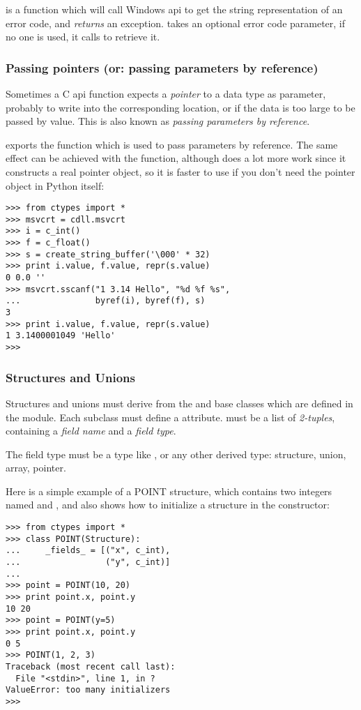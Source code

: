  is a function which will call Windows 
api to get the string representation of an error code, and \emph{returns}
an exception.   takes an optional error code parameter, if
no one is used, it calls  to retrieve it.


\subsubsection{Passing pointers (or: passing parameters by reference)\label{ctypes-passing-pointers}}

Sometimes a C api function expects a \emph{pointer} to a data type as
parameter, probably to write into the corresponding location, or if
the data is too large to be passed by value. This is also known as
\emph{passing parameters by reference}.

 exports the  function which is used to pass
parameters by reference.  The same effect can be achieved with the
 function, although  does a lot more work since
it constructs a real pointer object, so it is faster to use 
if you don't need the pointer object in Python itself:
\begin{verbatim}
>>> from ctypes import *
>>> msvcrt = cdll.msvcrt
>>> i = c_int()
>>> f = c_float()
>>> s = create_string_buffer('\000' * 32)
>>> print i.value, f.value, repr(s.value)
0 0.0 ''
>>> msvcrt.sscanf("1 3.14 Hello", "%d %f %s",
...               byref(i), byref(f), s)
3
>>> print i.value, f.value, repr(s.value)
1 3.1400001049 'Hello'
>>>
\end{verbatim}


\subsubsection{Structures and Unions\label{ctypes-structures-unions}}

Structures and unions must derive from the  and 
base classes which are defined in the  module. Each subclass
must define a  attribute.   must be a list of
\emph{2-tuples}, containing a \emph{field name} and a \emph{field type}.

The field type must be a  type like , or any other
derived  type: structure, union, array, pointer.

Here is a simple example of a POINT structure, which contains two
integers named  and , and also shows how to initialize a
structure in the constructor:
\begin{verbatim}
>>> from ctypes import *
>>> class POINT(Structure):
...     _fields_ = [("x", c_int),
...                 ("y", c_int)]
...
>>> point = POINT(10, 20)
>>> print point.x, point.y
10 20
>>> point = POINT(y=5)
>>> print point.x, point.y
0 5
>>> POINT(1, 2, 3)
Traceback (most recent call last):
  File "<stdin>", line 1, in ?
ValueError: too many initializers
>>>
\end{verbatim}

